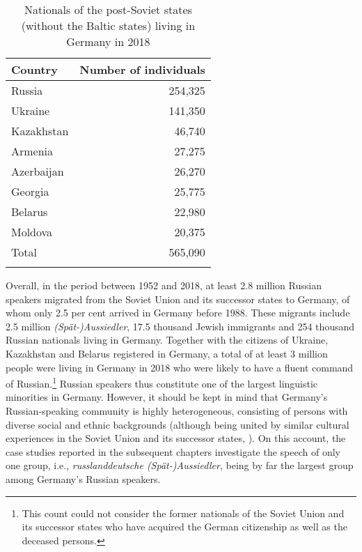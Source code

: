 \begin{table}
\begin{tabular}{l r}
	\lsptoprule
			Country	&Number of individuals \\
			\midrule
			Russia	&254,325\\
			Ukraine	&141,350\\
			Kazakhstan &46,740\\
			Armenia &27,275\\
			Azerbaijan &26,270\\
			Georgia &25,775\\
			Belarus &22,980\\
            Moldova &20,375\\
			Total &565,090\\
			\lspbottomrule
\end{tabular}
\caption{Nationals of the post-Soviet states (without the Baltic states) living in Germany in 2018 \citep[adopted from][276--278]{bamf}\label{tab:3:1}}
\end{table}

Overall, in the period between 1952 and 2018, at least 2.8 million Russian speakers migrated from the Soviet Union and its successor states to Germany, of whom only 2.5 per cent arrived in Germany before 1988. These migrants include 2.5 million \textit{(Spät-)Aussiedler}, 17.5 thousand Jewish immigrants and 254 thousand Russian nationals living in Germany. Together with the citizens of Ukraine, Kazakhstan and Belarus registered in Germany, a total of at least 3 million people were living in Germany in 2018 who were likely to have a fluent command of Russian.\footnote{This count could not consider the former nationals of the Soviet Union and its successor states who have acquired the German citizenship as well as the deceased persons.} Russian speakers thus constitute one of the largest linguistic minorities in Germany. However, it should be kept in mind that Germany's Russian-speaking community is highly heterogeneous, consisting of persons with diverse social and ethnic backgrounds (although being united by similar cultural experiences in the Soviet Union and its successor states, \citealt[cf.][]{gasimov-paper, levkovych}). On this account, the case studies reported in the subsequent chapters investigate the speech of only one group, i.e., \textit{russlanddeutsche (Spät-)Aussiedler}, being by far the largest group among Germany's Russian speakers.

